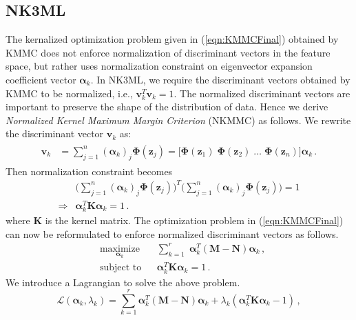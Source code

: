 \documentclass[runningheads]{llncs}
\begin{document}
\subsection{NK3ML}
\label{ssec:NK3ML}

The kernalized optimization problem given in (\ref{eqn:KMMCFinal}) obtained by KMMC\cite{haifeng:mmc} does not enforce normalization of discriminant vectors in the feature space, but rather uses normalization constraint on eigenvector expansion coefficient vector $\bm{\alpha}_k$. In NK3ML, we require the discriminant vectors obtained by KMMC  to be normalized, i.e., $\mathbf{v}_k^T\mathbf{v}_k =1$. The normalized discriminant vectors are important to preserve the shape of the distribution of data. Hence we derive \textit{Normalized Kernel Maximum Margin Criterion} (NKMMC) as follows. We rewrite the discriminant vector $\mathbf{v}_k$ as:
\begin{eqnarray}
\begin{aligned}
\mathbf{v}_k &= \sum \limits_{j=1}^{n} (\bm{\alpha}_{k})_j \mathbf{\Phi}(\mathbf{z}_j) = \Big[\mathbf{\Phi}(\mathbf{z}_1) \; \mathbf{\Phi}(\mathbf{z}_2)\; \ldots \;\mathbf{\Phi}(\mathbf{z}_n) \Big] \bm{\alpha}_k \,.
\end{aligned}
\end{eqnarray}
\noindent Then normalization constraint becomes
\begin{eqnarray}
&\Big(\sum \limits_{j=1}^{n} (\bm{\alpha}_{k})_j \mathbf{\Phi}(\mathbf{z}_j)\Big)^T \Big(\sum \limits_{j=1}^{n} (\bm{\alpha}_{k})_j \mathbf{\Phi}(\mathbf{z}_j)\Big) =1 \nonumber\\
\Rightarrow &\bm{\alpha}_k^T \mathbf{K} \bm{\alpha}_k =1 \,.
\end{eqnarray}
where $\mathbf{K}$ is the kernel matrix. The optimization problem in (\ref{eqn:KMMCFinal}) can now be reformulated to enforce normalized discriminant vectors as follows.
\begin{equation}
\begin{aligned}
& \underset{\bm{\alpha}_{k}}{\text{maximize}} & & \sum\limits_{k=1}^r \;  \bm{\alpha}^T_{k} (\mathbf{M}  -  \mathbf{N}) \bm{\alpha}_{k} \,,\\
\label{eqn:CKMMCFinal}
& \text{subject to}     & & \bm{\alpha}^T_{k}\mathbf{K} \bm{\alpha}_{k} = 1 \,.
\end{aligned}
\end{equation}
\noindent We introduce a Lagrangian to solve the above problem.
\begin{equation}
\mathcal{L}(\bm{\alpha}_k,\lambda_k) =
\sum \limits_{k=1}^{r} \bm{\alpha}_k^T (\mathbf{M-N}) \bm{\alpha}_k + \lambda_k(\bm{\alpha}^T_{k}\mathbf{K} \bm{\alpha}_{k} - 1) \,,
\end{equation}
\end{document}
